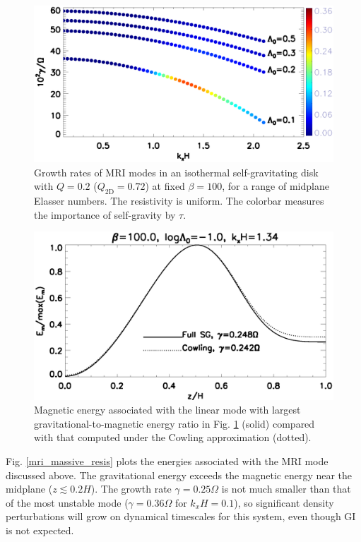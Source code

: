 \begin{figure}
  \includegraphics[width=\linewidth]{figures/compare_energy_resis}
  \caption{
    Growth rates of MRI modes in an isothermal self-gravitating
    disk with $Q=0.2$ ($Q_\mathrm{2D}=0.72$) at fixed $\beta=100$, 
    for a range of midplane Elasser numbers. The resistivity is
    uniform. The colorbar measures the importance of self-gravity by $\tau$. 
    \label{gravity_energy_resis}}
\end{figure}


\begin{figure}
  \includegraphics[width=\linewidth]{figures/compare_result_cowling}
  \caption{Magnetic energy associated with the linear mode with
    largest gravitational-to-magnetic energy ratio in 
    Fig. \ref{gravity_energy_resis} (solid) compared with that computed
    under the Cowling approximation (dotted). %
    \label{mri_massive_cowling}}
\end{figure}

Fig. \ref{mri_massive_resis} plots the energies associated with the 
MRI mode discussed above. 
The gravitational energy exceeds the 
magnetic energy near the midplane ($z\lesssim0.2H$). The growth rate
$\gamma=0.25\Omega$ is not much smaller than that of the most unstable
mode ($\gamma=0.36\Omega$ for $k_xH=0.1$), so significant density
perturbations will grow on dynamical timescales for this
system, even though GI is not expected.

